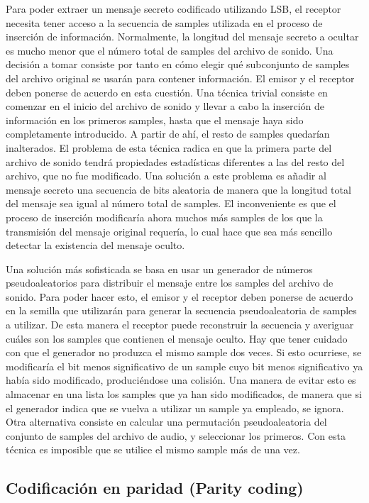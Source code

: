 \documentclass[12pt]{article}
\begin{document}
Para poder extraer un mensaje secreto codificado utilizando LSB, el receptor necesita tener acceso a la secuencia de samples utilizada en el proceso de inserción de información. Normalmente, la longitud del mensaje secreto a ocultar es mucho menor que el número total de samples del archivo de sonido. Una decisión a tomar consiste por tanto en cómo elegir qué subconjunto de samples del archivo original se usarán para contener información. El emisor y el receptor deben ponerse de acuerdo en esta cuestión. Una técnica trivial consiste en comenzar en el inicio del archivo de sonido y llevar a cabo la inserción de información en los primeros samples, hasta que el mensaje haya sido completamente introducido. A partir de ahí, el resto de samples quedarían inalterados. El problema de esta técnica radica en que la primera parte del archivo de sonido tendrá propiedades estadísticas diferentes a las del resto del archivo, que no fue modificado. Una solución a este problema es añadir al mensaje secreto una secuencia de bits aleatoria de manera que la longitud total del mensaje sea igual al número total de samples. El inconveniente es que el proceso de inserción modificaría ahora muchos más samples de los que la transmisión del mensaje original requería, lo cual hace que sea más sencillo detectar la existencia del mensaje oculto.

Una solución más sofisticada se basa en usar un generador de números pseudoaleatorios para distribuir el mensaje entre los samples del archivo de sonido. Para poder hacer esto, el emisor y el receptor deben ponerse de acuerdo en la semilla que utilizarán para generar la secuencia pseudoaleatoria de samples a utilizar. De esta manera el receptor puede reconstruir la secuencia y averiguar cuáles son los samples que contienen el mensaje oculto. Hay que tener cuidado con que el generador no produzca el mismo sample dos veces. Si esto ocurriese, se modificaría el bit menos significativo de un sample cuyo bit menos significativo ya había sido modificado, produciéndose una colisión. Una manera de evitar esto es almacenar en una lista los samples que ya han sido modificados, de manera que si el generador indica que se vuelva a utilizar un sample ya empleado, se ignora. Otra alternativa consiste en calcular una permutación pseudoaleatoria del conjunto de samples del archivo de audio, y seleccionar los primeros. Con esta técnica es imposible que se utilice el mismo sample más de una vez.

\subsection{Codificación en paridad (Parity coding)}
\end{document}
